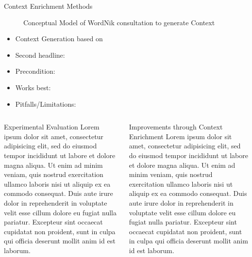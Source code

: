 \documentclass[final,hyperref={pdfpagelabels=true}]{beamer}
\begin{document}
\begin{frame}
\begin{columns}[t, onlytextwidth]
\begin{column}{\textwidth}
\begin{column}{\textwidth}
\begin{block}{Context Enrichment Methods}
\begin{minipage}[t]{.3\linewidth}
\begin{figure}[H]
						 \caption{Conceptual Model of WordNik consultation to generate Context}
					\end{figure}
					\vspace{-1cm}
					\hrulefill
					\vspace{1.5cm}
					\begin{itemize}
						\small
						\item Context Generation based on \color{BeamerBlue}{Dictionary Lookup}
						\item Second headline: 
						\item Precondition: 
						\item Works best:
						\item Pitfalls/Limitations: 
					\end{itemize}
				\end{minipage}
				\hfill
			\end{block}
		\end{column}
		
		
		\begin{columns}[t, onlytextwidth]
			\begin{column}{.49\linewidth}
				\begin{block}{Experimental Evaluation}
					    Lorem ipsum dolor sit amet, consectetur adipisicing elit, sed do eiusmod tempor incididunt ut labore et dolore magna aliqua. Ut enim ad minim veniam, quis nostrud exercitation ullamco laboris nisi ut aliquip ex ea commodo consequat. Duis aute irure dolor in reprehenderit in voluptate velit esse cillum dolore eu fugiat nulla pariatur. Excepteur sint occaecat cupidatat non proident, sunt in culpa qui officia deserunt mollit anim id est laborum.
				\end{block}
			\end{column}
			\begin{column}{.49\linewidth}
				\begin{block}{Improvements through Context Enrichment}
					    Lorem ipsum dolor sit amet, consectetur adipisicing elit, sed do eiusmod tempor incididunt ut labore et dolore magna aliqua. Ut enim ad minim veniam, quis nostrud exercitation ullamco laboris nisi ut aliquip ex ea commodo consequat. Duis aute irure dolor in reprehenderit in voluptate velit esse cillum dolore eu fugiat nulla pariatur. Excepteur sint occaecat cupidatat non proident, sunt in culpa qui officia deserunt mollit anim id est laborum.
				\end{block}
			\end{column}
		\end{columns}
		
    \end{column}

  \end{columns}
\end{frame}
\end{document}
